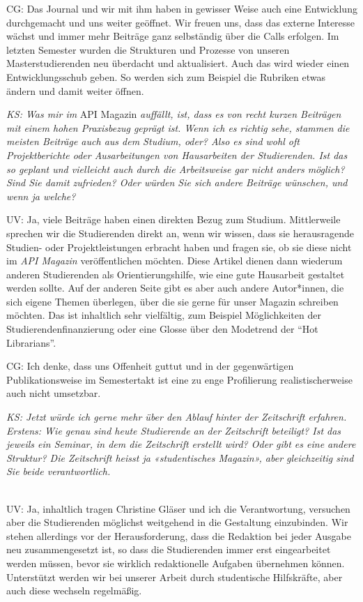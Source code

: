 \documentclass[a4paper,
fontsize=11pt,
oneside,
numbers=noperiodatend,
parskip=half-,
bibliography=totoc,
final
]{scrartcl}
\begin{document}
CG: Das Journal und wir mit ihm haben in gewisser Weise auch eine
Entwicklung durchgemacht und uns weiter geöffnet. Wir freuen uns, dass
das externe Interesse wächst und immer mehr Beiträge ganz selbständig
über die Calls erfolgen. Im letzten Semester wurden die Strukturen und
Prozesse von unseren Masterstudierenden neu überdacht und aktualisiert.
Auch das wird wieder einen Entwicklungsschub geben. So werden sich zum
Beispiel die Rubriken etwas ändern und damit weiter öffnen.

\emph{KS: Was mir im} API Magazin \emph{auffällt, ist, dass es von recht
kurzen Beiträgen mit einem hohen Praxisbezug geprägt ist. Wenn ich es
richtig sehe, stammen die meisten Beiträge auch aus dem Studium, oder?
Also es sind wohl oft Projektberichte oder Ausarbeitungen von
Hausarbeiten der Studierenden. Ist das so geplant und vielleicht auch
durch die Arbeitsweise gar nicht anders möglich? Sind Sie damit
zufrieden? Oder würden Sie sich andere Beiträge wünschen, und wenn ja
welche?}

UV: Ja, viele Beiträge haben einen direkten Bezug zum Studium.
Mittlerweile sprechen wir die Studierenden direkt an, wenn wir wissen,
dass sie herausragende Studien- oder Projektleistungen erbracht haben
und fragen sie, ob sie diese nicht im \emph{API Magazin} veröffentlichen
möchten. Diese Artikel dienen dann wiederum anderen Studierenden als
Orientierungshilfe, wie eine gute Hausarbeit gestaltet werden sollte.
Auf der anderen Seite gibt es aber auch andere Autor*innen, die sich
eigene Themen überlegen, über die sie gerne für unser Magazin schreiben
möchten. Das ist inhaltlich sehr vielfältig, zum Beispiel Möglichkeiten
der Studierendenfinanzierung oder eine Glosse über den Modetrend der
\enquote{Hot Librarians}.

CG: Ich denke, dass uns Offenheit guttut und in der gegenwärtigen
Publikationsweise im Semestertakt ist eine zu enge Profilierung
realistischerweise auch nicht umsetzbar.

\emph{KS: Jetzt würde ich gerne mehr über den Ablauf hinter der
Zeitschrift erfahren. Erstens: Wie genau sind heute Studierende an der
Zeitschrift beteiligt? Ist das jeweils ein Seminar, in dem die
Zeitschrift erstellt wird? Oder gibt es eine andere Struktur? Die
Zeitschrift heisst ja «studentisches Magazin», aber gleichzeitig sind
Sie beide verantwortlich.}\\
\strut \\
UV: Ja, inhaltlich tragen Christine Gläser und ich die Verantwortung,
versuchen aber die Studierenden möglichst weitgehend in die Gestaltung
einzubinden. Wir stehen allerdings vor der Herausforderung, dass die
Redaktion bei jeder Ausgabe neu zusammengesetzt ist, so dass die
Studierenden immer erst eingearbeitet werden müssen, bevor sie wirklich
redaktionelle Aufgaben übernehmen können. Unterstützt werden wir bei
unserer Arbeit durch studentische Hilfskräfte, aber auch diese wechseln
regelmäßig.
\end{document}
